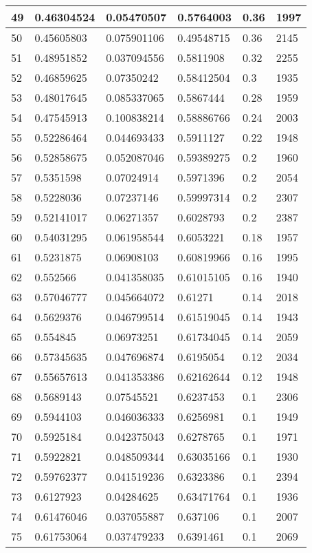 \begin{longtable}{|l|l|l|l|l|l|}
49 & 0.46304524 & 0.05470507 & 0.5764003 & 0.36 & 1997 \\ \hline 
50 & 0.45605803 & 0.075901106 & 0.49548715 & 0.36 & 2145 \\ \hline 
51 & 0.48951852 & 0.037094556 & 0.5811908 & 0.32 & 2255 \\ \hline 
52 & 0.46859625 & 0.07350242 & 0.58412504 & 0.3 & 1935 \\ \hline 
53 & 0.48017645 & 0.085337065 & 0.5867444 & 0.28 & 1959 \\ \hline 
54 & 0.47545913 & 0.100838214 & 0.58886766 & 0.24 & 2003 \\ \hline 
55 & 0.52286464 & 0.044693433 & 0.5911127 & 0.22 & 1948 \\ \hline 
56 & 0.52858675 & 0.052087046 & 0.59389275 & 0.2 & 1960 \\ \hline 
57 & 0.5351598 & 0.07024914 & 0.5971396 & 0.2 & 2054 \\ \hline 
58 & 0.5228036 & 0.07237146 & 0.59997314 & 0.2 & 2307 \\ \hline 
59 & 0.52141017 & 0.06271357 & 0.6028793 & 0.2 & 2387 \\ \hline 
60 & 0.54031295 & 0.061958544 & 0.6053221 & 0.18 & 1957 \\ \hline 
61 & 0.5231875 & 0.06908103 & 0.60819966 & 0.16 & 1995 \\ \hline 
62 & 0.552566 & 0.041358035 & 0.61015105 & 0.16 & 1940 \\ \hline 
63 & 0.57046777 & 0.045664072 & 0.61271 & 0.14 & 2018 \\ \hline 
64 & 0.5629376 & 0.046799514 & 0.61519045 & 0.14 & 1943 \\ \hline 
65 & 0.554845 & 0.06973251 & 0.61734045 & 0.14 & 2059 \\ \hline 
66 & 0.57345635 & 0.047696874 & 0.6195054 & 0.12 & 2034 \\ \hline 
67 & 0.55657613 & 0.041353386 & 0.62162644 & 0.12 & 1948 \\ \hline 
68 & 0.5689143 & 0.07545521 & 0.6237453 & 0.1 & 2306 \\ \hline 
69 & 0.5944103 & 0.046036333 & 0.6256981 & 0.1 & 1949 \\ \hline 
70 & 0.5925184 & 0.042375043 & 0.6278765 & 0.1 & 1971 \\ \hline 
71 & 0.5922821 & 0.048509344 & 0.63035166 & 0.1 & 1930 \\ \hline 
72 & 0.59762377 & 0.041519236 & 0.6323386 & 0.1 & 2394 \\ \hline 
73 & 0.6127923 & 0.04284625 & 0.63471764 & 0.1 & 1936 \\ \hline 
74 & 0.61476046 & 0.037055887 & 0.637106 & 0.1 & 2007 \\ \hline 
75 & 0.61753064 & 0.037479233 & 0.6391461 & 0.1 & 2069 \\ \hline 
\end{longtable}